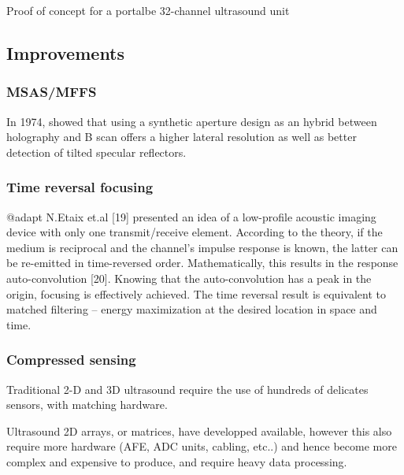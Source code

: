 \documentclass[conference]{IEEEtran}
\begin{document}
 
Proof of concept for a portalbe 32-channel ultrasound unit \cite{kim_single_2012}

\subsection{Improvements}
 
\subsubsection{MSAS/MFFS}



\cite{ylitalo_ultrasound_1994}

\cite{heuvel_development_2017}

\cite{nikolov_fast_2008}


In 1974, \cite{burckhardt_experimental_1974} showed that using a synthetic aperture design as an hybrid  between holography and B scan offers a higher lateral resolution as well as better detection of tilted specular reflectors.

\subsubsection{Time reversal focusing}

@adapt N.Etaix et.al [19] presented an idea of a low-profile acoustic imaging device with only one transmit/receive element. According to the theory, if the medium is reciprocal and the channel’s impulse response is known, the latter can be re-emitted in time-reversed order. Mathematically, this results in the response auto-convolution [20]. Knowing that the auto-convolution has a peak in the origin, focusing is effectively achieved. The time reversal result is equivalent to matched filtering – energy maximization at the desired location in space and time.

\subsubsection{Compressed sensing}

Traditional 2-D and 3D ultrasound require the use of hundreds of delicates sensors, with matching hardware. 

Ultrasound 2D arrays, or matrices, have developped available, however this also require more hardware (AFE, ADC units, cabling, etc..) and hence become more
complex and expensive to produce, and require heavy data processing.
\end{document}
